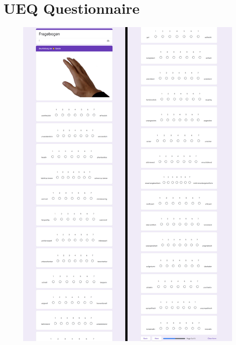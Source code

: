 \section{UEQ Questionnaire}
\begin{figure}[!h]
\centering
\includegraphics[width=\textwidth]{figures/Appendix/ueq.png}
\end{figure}

